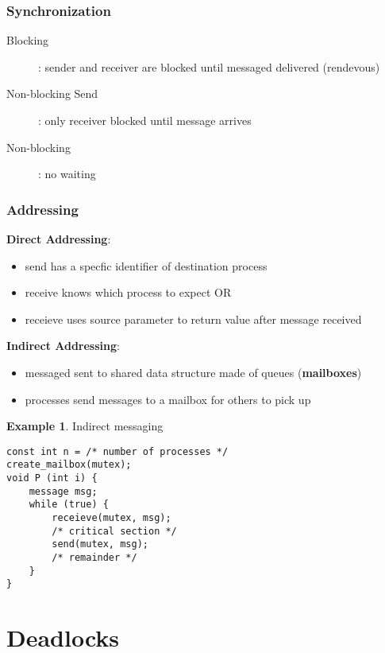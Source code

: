 \documentclass[]{article}
\theoremstyle{definition}
\newtheorem{ex}{Example}[section]
\begin{document}
				\subsubsection{Synchronization}
					\begin{description}
						\item[Blocking]: sender and receiver are blocked until messaged delivered (rendevous)
						\item[Non-blocking Send]: only receiver blocked until message arrives
						\item[Non-blocking]: no waiting
					\end{description}
				\subsubsection{Addressing}
				\textbf{Direct Addressing}:
				\begin{itemize}
					\item send has a specfic identifier of destination process
					\item receive knows which process to expect OR
					\item receieve uses source parameter to return value after message received
				\end{itemize}
				\textbf{Indirect Addressing}:
				\begin{itemize}
					\item messaged sent to shared data structure made of queues (\textbf{mailboxes})
					\item processes send messages to a mailbox for others to pick up
				\end{itemize}
				\begin{ex}
					Indirect messaging
					\begin{lstlisting}
const int n = /* number of processes */
create_mailbox(mutex);
void P (int i) {
	message msg;
	while (true) {
		receieve(mutex, msg);
		/* critical section */
		send(mutex, msg);
		/* remainder */
	}
}
					\end{lstlisting}
				\end{ex}

	\section{Deadlocks}
\end{document}
